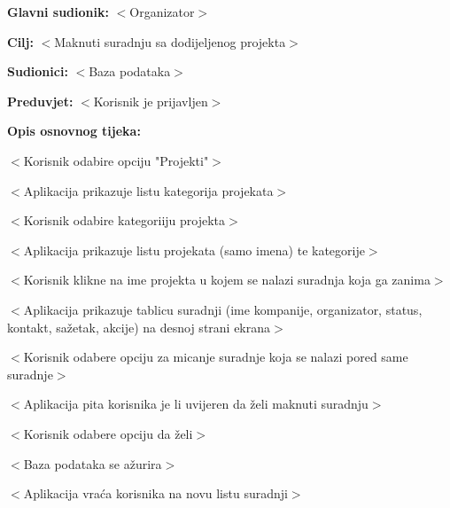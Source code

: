 					\noindent {}
					\begin{packed_item}

						\item \textbf{Glavni sudionik: }$<$Organizator$>$
						\item  \textbf{Cilj:} $<$Maknuti suradnju sa dodijeljenog projekta$>$
						\item  \textbf{Sudionici:} $<$Baza podataka$>$
						\item  \textbf{Preduvjet:} $<$Korisnik je prijavljen$>$
						\item  \textbf{Opis osnovnog tijeka:}

						\item[] \begin{packed_enum}

									\item $<$Korisnik odabire opciju "Projekti"$>$
									\item $<$Aplikacija prikazuje listu kategorija projekata$>$
									\item $<$Korisnik odabire kategoriiju projekta$>$
									\item $<$Aplikacija prikazuje listu projekata (samo imena) te kategorije$>$
									\item $<$Korisnik klikne na ime projekta u kojem se nalazi suradnja koja ga zanima$>$
									\item $<$Aplikacija prikazuje tablicu suradnji (ime kompanije, organizator, status,
									kontakt, sažetak, akcije) na desnoj strani ekrana$>$
									\item $<$Korisnik odabere opciju za micanje suradnje koja se nalazi pored same suradnje$>$
									\item $<$Aplikacija pita korisnika je li uvijeren da želi maknuti suradnju$>$
									\item $<$Korisnik odabere opciju da želi$>$
									\item $<$Baza podataka se ažurira$>$
									\item $<$Aplikacija vraća korisnika na novu listu suradnji$>$
						\end{packed_enum}
					\end{packed_item}


